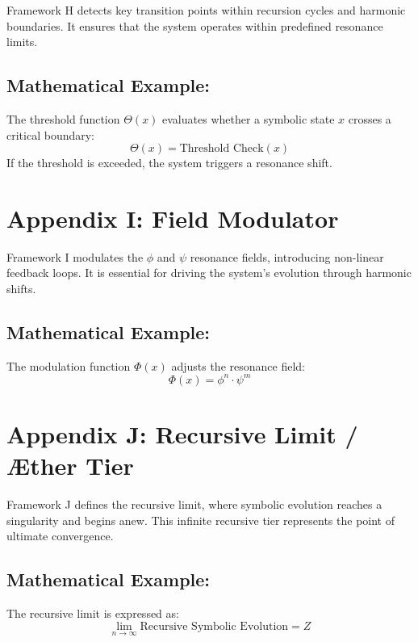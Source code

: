 \documentclass[12pt]{article}
\begin{document}
Framework H detects key transition points within recursion cycles and harmonic boundaries. It ensures that the system operates within predefined resonance limits.

\subsection*{Mathematical Example:}
The threshold function $\Theta(x)$ evaluates whether a symbolic state $x$ crosses a critical boundary:
\[
\Theta(x) = \text{Threshold Check}(x)
\]
If the threshold is exceeded, the system triggers a resonance shift.

\newpage

\section*{Appendix I: Field Modulator}

Framework I modulates the $\phi$ and $\psi$ resonance fields, introducing non-linear feedback loops. It is essential for driving the system’s evolution through harmonic shifts.

\subsection*{Mathematical Example:}
The modulation function $\Phi(x)$ adjusts the resonance field:
\[
\Phi(x) = \phi^n \cdot \psi^m
\]

\newpage

\section*{Appendix J: Recursive Limit / Æther Tier}

Framework J defines the recursive limit, where symbolic evolution reaches a singularity and begins anew. This infinite recursive tier represents the point of ultimate convergence.

\subsection*{Mathematical Example:}
The recursive limit is expressed as:
\[
\lim_{n \to \infty} \text{Recursive Symbolic Evolution} = Z
\]
\end{document}
